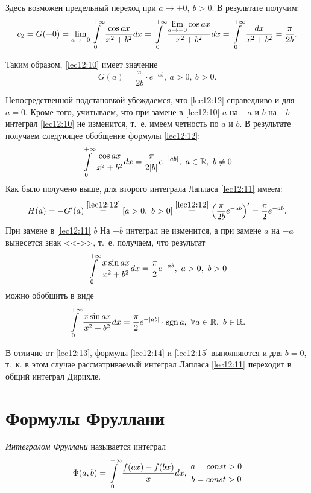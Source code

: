 \documentclass[../../main.tex]{subfiles}
\begin{document}
Здесь возможен предельный переход при $a \to +0,\ b > 0$. В результате получим:
\[c_2 = G(+0) = \lim_{a\to+0} \int\limits_{0}^{+\infty} \frac{\cos ax}{x^2 + b^2}dx = \int\limits_{0}^{+\infty} 
\frac{\lim\limits_{a\to+0} \cos ax}{x^2 + b^2}dx = \int\limits_{0}^{+\infty} \frac{dx}{x^2 + b^2} 
= \frac{\pi}{2b}.\]

Таким образом, \eqref{lec12:10} имеет значение
\begin{equation}
G(a) = \frac\pi{2b}\cdot e^{-ab},\ a > 0,\ b > 0.
\label{lec12:12}
\end{equation}

Непосредственной подстановкой убеждаемся, что \eqref{lec12:12} справедливо и 
для $a=0$. Кроме того, учитываем, что при замене в \eqref{lec12:10} $a$ на 
$-a$ и $b$ на $-b$ интеграл \eqref{lec12:10} не изменится, т.~е. имеем 
четность по $a$ и $b$. В результате получаем следующее обобщение формулы 
\eqref{lec12:12}:
\begin{equation}
\int\limits_{0}^{+\infty} \frac{\cos ax}{x^2 + b^2}dx = \frac{\pi}{2|b|} e^{-|ab|},\ a \in \mathbb{R},\ b 
\ne 0
\label{lec12:13}
\end{equation}
Как было получено выше, для второго интеграла Лапласа \eqref{lec12:11} имеем:
\[H(a) = -G'(a) \stk{lec12:12}= [a > 0,\ b > 0] \stk{lec12:12}= 
\left(\frac\pi{2b} e^{-ab}\right)' = \frac\pi2 e^{-ab}.\]
При замене в \eqref{lec12:11} $b$ На $-b$ интеграл не изменится, а при замене 
$a$ на $-a$ вынесется знак <<->>, т.~е. получаем, что результат
\begin{equation}
\int\limits_{0}^{+\infty} \frac{x\sin ax}{x^2 + b^2} dx = \frac{\pi}2 e^{-ab},\ a > 0,\ b > 0
\label{lec12:14}
\end{equation}
можно обобщить в виде
\begin{equation}
\ioinf \frac{x\sin ax}{x^2 + b^2} dx = \frac\pi2 e^{-|ab|}\cdot\sgn a,\ 
\forall a \in \R,\ b \in \R.
\label{lec12:15}
\end{equation}

В отличие от \eqref{lec12:13}, формулы \eqref{lec12:14} и \eqref{lec12:15} 
выполняются и для $b = 0$, т.~к. в этом случае рассматриваемый интеграл 
Лапласа \eqref{lec12:11} переходит в общий интеграл Дирихле. 

\section{Формулы Фруллани}

\emph{Интегралом Фруллани} называется интеграл
\begin{equation}
\Phi(a, b) = \ioinf \frac{f(ax) - f(bx)}{x} dx,\ 
\begin{gathered}
a = const > 0 \\
b = const > 0
\end{gathered}
\label{lec12:16}
\end{equation}
\end{document}
